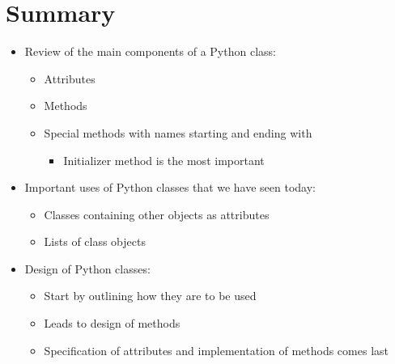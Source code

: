 \documentclass[letterpaper,10pt,english]{sphinxmanual}
\begin{document}
\section{Summary}
\label{\detokenize{lecture_notes/lec19_classes2:summary}}\begin{itemize}
\item {} 
Review of the main components of a Python class:
\begin{itemize}
\item {} 
Attributes

\item {} 
Methods

\item {} 
Special methods with names starting and ending with \sphinxcode{\sphinxupquote{\_\_}}
\begin{itemize}
\item {} 
Initializer method is the most important

\end{itemize}

\end{itemize}

\item {} 
Important uses of Python classes that we have seen today:
\begin{itemize}
\item {} 
Classes containing other objects as attributes

\item {} 
Lists of class objects

\end{itemize}

\item {} 
Design of Python classes:
\begin{itemize}
\item {} 
Start by outlining how they are to be used

\item {} 
Leads to design of methods

\item {} 
Specification of attributes and implementation of methods comes
last

\end{itemize}

\end{itemize}
\end{document}
